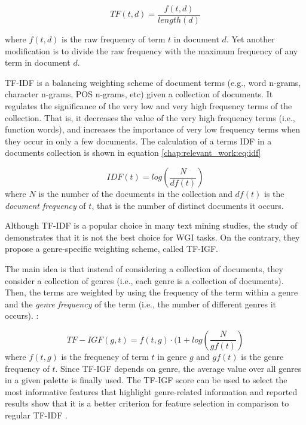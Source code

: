 \begin{equation}
    TF(t,d) = \frac{f(t,d)}{length(d)}
\end{equation}

\nointend where $f(t,d)$ is the raw frequency of term $t$ in document $d$. Yet another modification is to divide the raw frequency with the maximum frequency of any term in document $d$.

TF-IDF is a balancing weighting scheme of document terms (e.g., word n-grams, character n-grams, POS n-grams, etc) given a collection of documents. It regulates the significance of the very low and very high frequency terms of the collection. That is, it decreases the value of the very high frequency terms (i.e., function words), and increases the importance of very low frequency terms when they occur in only a few documents. The calculation of a terms IDF in a documents collection is shown in equation \ref{chap:relevant_work:eq:idf}
 
 \begin{equation}\label{chap:relevant_work:eq:idf}
 	IDF(t) = log \left( \frac{N}{df(t)} \right)
 \end{equation}
\noindent
where $N$ is the number of the documents in the collection and $df(t)$ is the \textit{document frequency} of $t$, that is the number of distinct documents it occurs. 

Although TF-IDF is a popular choice in many text mining studies, the study of \parencite{sugiyanto2014term} demonstrates that it is not the best choice for WGI tasks. On the contrary, they propose a genre-specific weighting scheme, called TF-IGF. 
 
The main idea is that instead of considering a collection of documents, they consider a collection of genres (i.e., each genre is a collection of documents). Then, the terms are weighted by using the frequency of the term within a genre and the \textit{genre frequency} of the term (i.e., the number of different genres it occurs). :

 \begin{equation}\label{chap:relevant_work:eq:tf_igf}
 	TF-IGF(g,t) = f(t,g) \cdot (1 + log \left( \frac{N}{gf(t)} \right)
 \end{equation}
\noindent
where $f(t,g)$ is the frequency of term $t$ in genre $g$ and $gf(t)$ is the genre frequency of $t$. Since TF-IGF depends on genre, the average value over all genres in a given palette is finally used. The TF-IGF score can be used to select the most informative features that highlight genre-related information and reported results show that it is a better criterion for feature selection in comparison to regular TF-IDF \parencite{sugiyanto2014term}.

